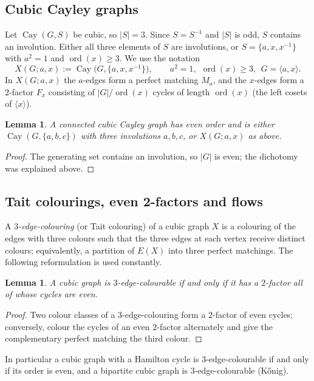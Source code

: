 \documentclass[11pt,a4paper]{article}
\newtheorem{lemma}[theorem]{Lemma}
\theoremstyle{definition}
\theoremstyle{remark}
\newcommand{\Cay}{\operatorname{Cay}}
\newcommand{\ord}{\operatorname{ord}}
\newcommand{\X}[3]{X(#1;#2,#3)}
\begin{document}
\subsection{Cubic Cayley graphs}
Let $\Cay(G,S)$ be cubic, so $|S|=3$.  Since $S=S^{-1}$ and $|S|$ is odd, $S$ contains an involution.  Either all three elements of $S$ are involutions, or $S=\{a,x,x^{-1}\}$ with $a^2=1$ and $\ord(x)\ge 3$.  We use the notation
\[
\X{G}{a}{x} := \Cay\bigl(G,\{a,x,x^{-1}\}\bigr),\qquad a^2=1,\ \ \ord(x)\ge 3,\ \ G=\langle a,x\rangle .
\]
In $\X{G}{a}{x}$ the $a$-edges form a perfect matching $M_a$, and the $x$-edges form a $2$-factor $F_x$ consisting of $|G|/\ord(x)$ cycles of length $\ord(x)$ (the left cosets of $\langle x\rangle$).

\begin{lemma}\label{lem:structure}
A connected cubic Cayley graph has even order and is either $\Cay(G,\{a,b,c\})$ with three involutions $a,b,c$, or $\X{G}{a}{x}$ as above.
\end{lemma}
\begin{proof}
The generating set contains an involution, so $|G|$ is even; the dichotomy was explained above.
\end{proof}

\subsection{Tait colourings, even 2-factors and flows}
A \emph{$3$-edge-colouring} (or Tait colouring) of a cubic graph $X$ is a colouring of the edges with three colours such that the three edges at each vertex receive distinct colours; equivalently, a partition of $E(X)$ into three perfect matchings.  The following reformulation is used constantly.

\begin{lemma}\label{lem:even2factor}
A cubic graph is $3$-edge-colourable if and only if it has a $2$-factor all of whose cycles are even.
\end{lemma}
\begin{proof}
Two colour classes of a $3$-edge-colouring form a $2$-factor of even cycles; conversely, colour the cycles of an even $2$-factor alternately and give the complementary perfect matching the third colour.
\end{proof}

In particular a cubic graph with a Hamilton cycle is $3$-edge-colourable if and only if its order is even, and a bipartite cubic graph is $3$-edge-colourable (K\H{o}nig).
\end{document}
